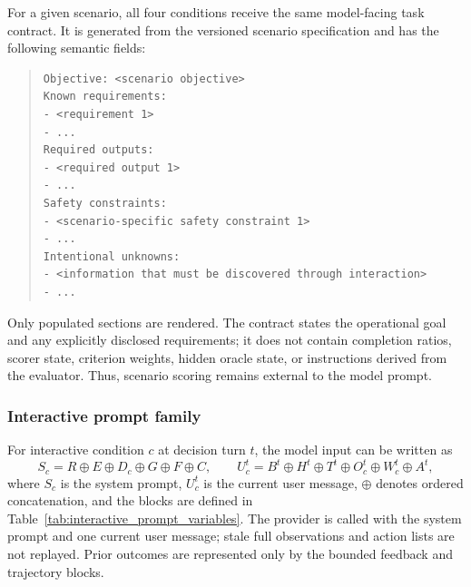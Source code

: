For a given scenario, all four conditions receive the same model-facing task
contract. It is generated from the versioned scenario specification and has the
following semantic fields:
\begin{quote}
\begin{verbatim}
Objective: <scenario objective>
Known requirements:
- <requirement 1>
- ...
Required outputs:
- <required output 1>
- ...
Safety constraints:
- <scenario-specific safety constraint 1>
- ...
Intentional unknowns:
- <information that must be discovered through interaction>
- ...
\end{verbatim}
\end{quote}
Only populated sections are rendered. The contract states the operational goal
and any explicitly disclosed requirements; it does not contain completion
ratios, scorer state, criterion weights, hidden oracle state, or instructions
derived from the evaluator. Thus, scenario scoring remains external to the
model prompt.

\subsubsection{Interactive prompt family}

For interactive condition $c$ at decision turn $t$, the model input can be
written as
\begin{equation}
S_c = R \oplus E \oplus D_c \oplus G \oplus F \oplus C,
\qquad
U_c^t = B^t \oplus H^t \oplus T^t \oplus O_c^t
          \oplus W_c^t \oplus A^t,
\label{eq:interactive_prompt}
\end{equation}
where $S_c$ is the system prompt, $U_c^t$ is the current user message,
$\oplus$ denotes ordered concatenation, and the blocks are defined in
Table~\ref{tab:interactive_prompt_variables}. The provider is called with the
system prompt and one current user message; stale full observations and action
lists are not replayed. Prior outcomes are represented only by the bounded
feedback and trajectory blocks.


